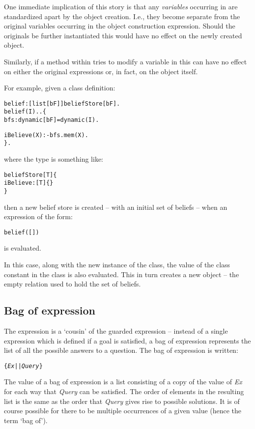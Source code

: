 \begin{aside}
One immediate implication of this story is that any \emph{variables} occurring in  are standardized apart by the object creation. I.e., they become separate from the original variables occurring in the object construction expression. Should the originals be further instantiated this would have no effect on the newly created object.

Similarly, if a method within  tries to modify a variable in  this can have no effect on either the original expressions or, in fact, on the object itself.
\end{aside}

For example, given a class definition:
\begin{alltt}
belief:[list[bF]] \sconarrow beliefStore[bF].
belief(I)..\{
  bfs:dynamic[bF] = dynamic(I).
  
  iBelieve(X) :- bfs.mem(X).
\}.
\end{alltt}
where the  type is something like:
\begin{alltt}
beliefStore[T] \impl \{
  iBelieve:[T]\{\}
\}
\end{alltt}
then a new belief store is created -- with an initial set of beliefs -- when an expression of the form:
\begin{alltt}
belief([])
\end{alltt}
is evaluated.

In this case, along with the new instance of the  class, the value of the class constant  in the  class is also evaluated. This in turn creates a new object -- the empty  relation used to hold the set of beliefs.

\subsection{Bag of expression}
\label{expression:bagof}
The  expression is a `cousin' of the guarded expression -- instead of a single expression which is defined if a goal is satisfied, a bag of expression represents the list of all the possible answers to a question. The bag of expression is written:
\begin{alltt}
\{ \emph{Ex} || \emph{Query} \}
\end{alltt}
The value of a bag of expression is a list consisting of a copy of the value of \emph{Ex} for each way that \emph{Query} can be satisfied. The order of elements in the resulting list is the same as the order that \emph{Query} gives rise to possible solutions. It is of course possible for there to be multiple occurrences of a given value (hence the term `bag of').

